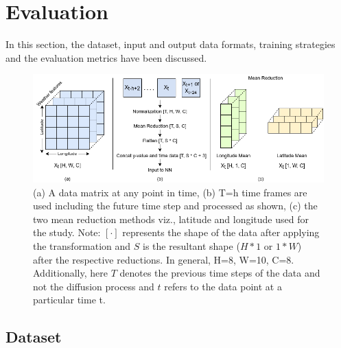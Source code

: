 \documentclass{article}
\begin{document}
\section{Evaluation}

In this section, the dataset, input and output data formats, training strategies and the evaluation metrics have been discussed.

\begin{figure}[t]
  \centering
  \includegraphics[width=1\textwidth]{data-proc.png}
  \caption{(a) A data matrix at any point in time, (b) T=h time frames are used including the future time step and processed as shown, (c) the two mean reduction methods viz., latitude and longitude used for the study. Note: $[\cdot]$ represents the shape of the data after applying the transformation and $S$ is the resultant shape ($H*1$ or $1*W$) after the respective reductions. In general, H=8, W=10, C=8. Additionally, here $T$ denotes the previous time steps of the data and not the diffusion process and $t$ refers to the data point at a particular time t.}
  \label{fig:data-proc}
\end{figure}

\subsection{Dataset}
\end{document}
